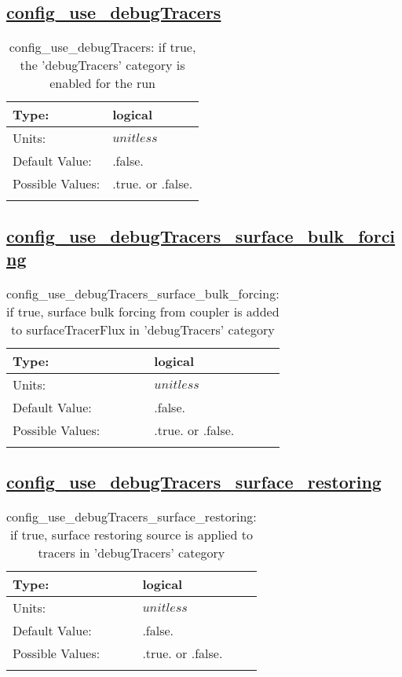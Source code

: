 \subsection[config\_use\_debugTracers]{\hyperref[sec:nm_tab_tracer_forcing_debugTracers]{config\_use\_debugTracers}}
\label{subsec:nm_sec_config_use_debugTracers}
\begin{center}
\begin{longtable}{| p{2.0in} || p{4.0in} |}
    \hline
    Type: & logical \\
    \hline
    Units: & $unitless$ \\
    \hline
    Default Value: & .false. \\
    \hline
    Possible Values: & .true. or .false. \\
    \hline
    \caption{config\_use\_debugTracers: if true, the 'debugTracers' category is enabled for the run}
\end{longtable}
\end{center}
\subsection[config\_use\_debugTracers\_surface\_bulk\_forcing]{\hyperref[sec:nm_tab_tracer_forcing_debugTracers]{config\_use\_debugTracers\_surface\_bulk\_forcing}}
\label{subsec:nm_sec_config_use_debugTracers_surface_bulk_forcing}
\begin{center}
\begin{longtable}{| p{2.0in} || p{4.0in} |}
    \hline
    Type: & logical \\
    \hline
    Units: & $unitless$ \\
    \hline
    Default Value: & .false. \\
    \hline
    Possible Values: & .true. or .false. \\
    \hline
    \caption{config\_use\_debugTracers\_surface\_bulk\_forcing: if true, surface bulk forcing from coupler is added to surfaceTracerFlux in 'debugTracers' category}
\end{longtable}
\end{center}
\subsection[config\_use\_debugTracers\_surface\_restoring]{\hyperref[sec:nm_tab_tracer_forcing_debugTracers]{config\_use\_debugTracers\_surface\_restoring}}
\label{subsec:nm_sec_config_use_debugTracers_surface_restoring}
\begin{center}
\begin{longtable}{| p{2.0in} || p{4.0in} |}
    \hline
    Type: & logical \\
    \hline
    Units: & $unitless$ \\
    \hline
    Default Value: & .false. \\
    \hline
    Possible Values: & .true. or .false. \\
    \hline
    \caption{config\_use\_debugTracers\_surface\_restoring: if true, surface restoring source is applied to tracers in 'debugTracers' category}
\end{longtable}
\end{center}
